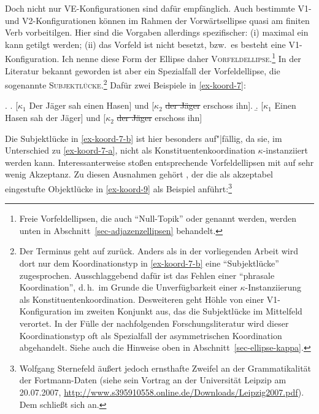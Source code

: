 Doch nicht nur VE-Konfigurationen sind dafür empfänglich. Auch bestimmte V1- und V2-Konfigurationen können im Rahmen der Vorwärtsellipse quasi am finiten Verb vorbeitilgen. Hier sind die Vorgaben allerdings spezifischer: (i) maximal ein  kann getilgt werden; (ii) das Vorfeld ist nicht besetzt, bzw.\ es besteht eine V1-Konfiguration. Ich nenne diese Form der Ellipse daher \textsc{Vorfeldellipse}.\footnote{Freie Vorfeldellipsen, die auch "`Null-Topik"' \citep{Fries:88} oder  genannt werden, werden unten in Abschnitt~\ref{sec-adjazenzellipsen} behandelt.} In der Literatur bekannt geworden ist aber ein Spezialfall der Vorfeldellipse, die sogenannte \textsc{Subjektlücke}.\footnote{Der Terminus geht auf \cite{Hoehle:83b} zurück. Anders als in der vorliegenden Arbeit wird dort nur dem Koordinationstyp in \ref{ex-koord-7-b} eine "`Subjektlücke"' zugesprochen. Ausschlaggebend dafür ist das Fehlen einer "`phrasale Koordination"', d.\,h.\ im Grunde die Unverfügbarkeit einer $\kappa$-Instanziierung als Konstituentenkoordination. Desweiteren geht Höhle von einer V1-Konfiguration im zweiten Konjunkt aus, das die Subjektlücke im Mittelfeld verortet. In der Fülle der nachfolgenden Forschungsliteratur wird dieser Koordinationstyp oft als Spezialfall der  asymmetrischen Koordination abgehandelt. Siehe auch die Hinweise oben in Abschnitt~\ref{sec-ellipse-kappa}.} Dafür zwei Beispiele in \ref{ex-koord-7}:   

\ex. \label{ex-koord-7}
\a. \label{ex-koord-7-a}[$\kappa_1$ Der Jäger sah einen Hasen] und [$\kappa_2$ \sout{der Jäger} erschoss ihn].
\b. \label{ex-koord-7-b}[$\kappa_1$ Einen Hasen sah der Jäger] und [$\kappa_2$ \sout{der Jäger} erschoss ihn]   

Die Subjektlücke in \ref{ex-koord-7-b} ist hier besonders auf"|fällig, da sie, im Unterschied zu \ref{ex-koord-7-a}, nicht als Konstituentenkoordination $\kappa$-instanziiert werden kann. Interessanterweise stoßen entsprechende Vorfeldellipsen mit  auf sehr wenig Akzeptanz. Zu diesen Ausnahmen gehört \cite{Fortmann:05}, der die als akzeptabel eingestufte Objektlücke in \ref{ex-koord-9} als Beispiel anführt:\footnote{Wolfgang Sternefeld äu\ss ert jedoch ernsthafte Zweifel an der Grammatikalität der Fortmann-Daten (siehe sein Vortrag an der Universität Leipzip am 20.07.2007, \url{http://www.s395910558.online.de/Downloads/Leipzig2007.pdf}). Dem schlie\ss t sich \citet[48ff]{Reich:09} an.} 

